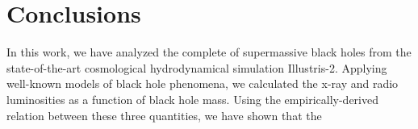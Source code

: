 \section{Conclusions}

\label{sec:conclusions}In this work, we have analyzed the complete
of supermassive black holes from the state-of-the-art cosmological
hydrodynamical simulation Illustris-2. Applying well-known models
of black hole phenomena, we calculated the x-ray and radio luminosities
as a function of black hole mass. Using the empirically-derived relation
between these three quantities, we have shown that the 
